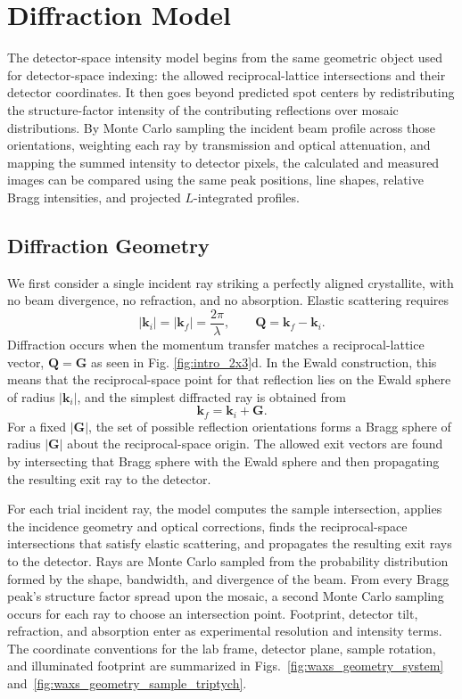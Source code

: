 \section{Diffraction Model}
\label{sec:diffraction_model}
The detector-space intensity model begins from the same geometric object used for detector-space indexing: the allowed reciprocal-lattice intersections and their detector coordinates.\cite{SmilgiesLi2026IndexGIXS} It then goes beyond predicted spot centers by redistributing the structure-factor intensity of the contributing reflections over mosaic distributions. By Monte Carlo sampling the incident beam profile across those orientations, weighting each ray by transmission and optical attenuation, and mapping the summed intensity to detector pixels, the calculated and measured images can be compared using the same peak positions, line shapes, relative Bragg intensities, and projected $L$-integrated profiles.
\subsection{Diffraction Geometry}

We first consider a single incident ray striking a perfectly aligned crystallite, with no beam divergence, no refraction, and no absorption. Elastic scattering requires
\[
|\mathbf{k}_i| = |\mathbf{k}_f| = \frac{2\pi}{\lambda},
\qquad
\mathbf{Q} = \mathbf{k}_f - \mathbf{k}_i.
\]
Diffraction occurs when the momentum transfer matches a reciprocal-lattice vector, $\mathbf{Q}=\mathbf{G}$ as seen in Fig. \ref{fig:intro_2x3}d. In the Ewald construction, this means that the reciprocal-space point for that reflection lies on the Ewald sphere of radius $|\mathbf{k}_i|$, and the simplest diffracted ray is obtained from
\[
\mathbf{k}_f = \mathbf{k}_i + \mathbf{G}.
\]
For a fixed $|\mathbf{G}|$, the set of possible reflection orientations forms a Bragg sphere of radius $|\mathbf{G}|$ about the reciprocal-space origin. The allowed exit vectors are found by intersecting that Bragg sphere with the Ewald sphere and then propagating the resulting exit ray to the detector.

For each trial incident ray, the model computes the sample intersection, applies the incidence geometry and optical corrections, finds the reciprocal-space intersections that satisfy elastic scattering, and propagates the resulting exit rays to the detector. Rays are Monte Carlo sampled from the probability distribution formed by the shape, bandwidth, and divergence of the beam. From every Bragg peak's structure factor spread upon the mosaic, a second Monte Carlo sampling occurs for each ray to choose an intersection point. Footprint, detector tilt, refraction, and absorption enter as experimental resolution and intensity terms. The coordinate conventions for the lab frame, detector plane, sample rotation, and illuminated footprint are summarized in Figs.~\ref{fig:waxs_geometry_system} and~\ref{fig:waxs_geometry_sample_triptych}.

